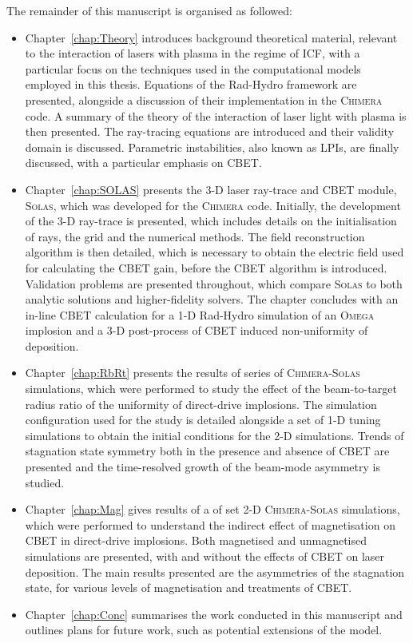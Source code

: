 The remainder of this manuscript is organised as followed:
\begin{itemize}
    \item Chapter~\ref{chap:Theory} introduces background theoretical material, relevant to the interaction of lasers with plasma in the regime of \ac{ICF}, with a particular focus on the techniques used in the computational models employed in this thesis.
    Equations of the \ac{Rad-Hydro} framework are presented, alongside a discussion of their implementation in the \textsc{Chimera} code.
    A summary of the theory of the interaction of laser light with plasma is then presented.
    The ray-tracing equations are introduced and their validity domain is discussed.
    Parametric instabilities, also known as \ac{LPIs}, are finally discussed, with a particular emphasis on \ac{CBET}.
    
    \item Chapter~\ref{chap:SOLAS} presents the 3-D laser ray-trace and \ac{CBET} module, \textsc{Solas}, which was developed for the \textsc{Chimera} code.
    Initially, the development of the 3-D ray-trace is presented, which includes details on the initialisation of rays, the grid and the numerical methods.
    The field reconstruction algorithm is then detailed, which is necessary to obtain the electric field used for calculating the \ac{CBET} gain, before the \ac{CBET} algorithm is introduced.
    Validation problems are presented throughout, which compare \textsc{Solas} to both analytic solutions and higher-fidelity solvers.
    The chapter concludes with an in-line \ac{CBET} calculation for a 1-D \ac{Rad-Hydro} simulation of an \textsc{Omega} implosion and a 3-D post-process of \ac{CBET} induced non-uniformity of deposition.
    
    \item Chapter~\ref{chap:RbRt} presents the results of series of \textsc{Chimera}-\textsc{Solas} simulations, which were performed to study the effect of the beam-to-target radius ratio of the uniformity of direct-drive implosions.
    The simulation configuration used for the study is detailed alongside a set of 1-D tuning simulations to obtain the initial conditions for the 2-D simulations.
    Trends of stagnation state symmetry both in the presence and absence of \ac{CBET} are presented and the time-resolved growth of the beam-mode asymmetry is studied.
    
    \item Chapter~\ref{chap:Mag} gives results of a of set 2-D \textsc{Chimera}-\textsc{Solas} simulations, which were performed to understand the indirect effect of magnetisation on \ac{CBET} in direct-drive implosions.
    Both magnetised and unmagnetised simulations are presented, with and without the effects of \ac{CBET} on laser deposition.
    The main results presented are the asymmetries of the stagnation state, for various levels of magnetisation and treatments of \ac{CBET}.
    
    \item Chapter~\ref{chap:Conc} summarises the work conducted in this manuscript and outlines plans for future work, such as potential extensions of the model.
    
\end{itemize}
